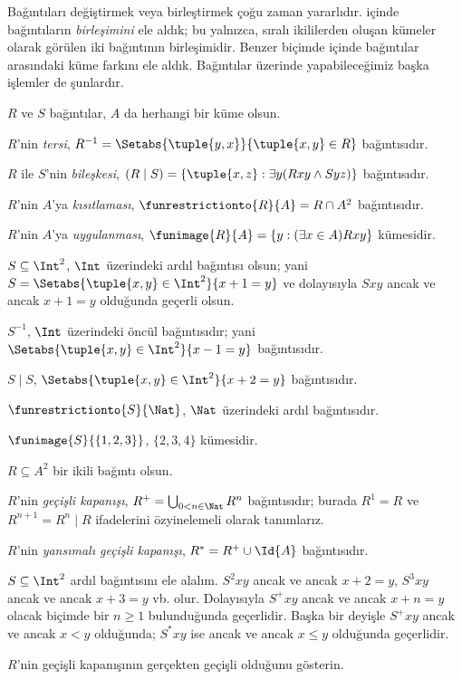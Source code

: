 \documentclass[../../../include/open-logic-section]{subfiles}
\begin{document}

Bağıntıları değiştirmek veya birleştirmek çoğu zaman yararlıdır.
 içinde bağıntıların
\emph{birleşimini} ele aldık; bu yalnızca, sıralı ikililerden oluşan kümeler
olarak görülen iki bağıntının birleşimidir. Benzer biçimde
 içinde bağıntılar arasındaki küme farkını
ele aldık. Bağıntılar üzerinde yapabileceğimiz başka işlemler de şunlardır.

\begin{defn}
$R$ ve $S$ bağıntılar, $A$ da herhangi bir küme olsun.

$R$'nin \emph{tersi},
$R^{-1}=\Setabs{\tuple{y,x}}{\tuple{x,y}\in R}$ bağıntısıdır.

$R$ ile $S$'nin \emph{bileşkesi},
$(R \mid S)=\{\tuple{x,z}:\exists y(Rxy\land Syz)\}$ bağıntısıdır.

$R$'nin $A$'ya \emph{kısıtlaması},
$\funrestrictionto{R}{A}=R\cap A^2$ bağıntısıdır.

$R$'nin $A$'ya \emph{uygulanması},
$\funimage{R}{A}=\{y:(\exists x \in A)Rxy\}$ kümesidir.
\end{defn}

\begin{ex}
$S \subseteq \Int^2$, $\Int$ üzerindeki ardıl bağıntısı olsun; yani
$S=\Setabs{\tuple{x,y}\in\Int^2}{x+1=y}$ ve dolayısıyla $Sxy$ ancak ve ancak
$x+1=y$ olduğunda geçerli olsun.

$S^{-1}$, $\Int$ üzerindeki öncül bağıntısıdır; yani
$\Setabs{\tuple{x,y}\in\Int^2}{x-1=y}$ bağıntısıdır.

$S\mid S$, $\Setabs{\tuple{x,y}\in\Int^2}{x+2=y}$ bağıntısıdır.

$\funrestrictionto{S}{\Nat}$, $\Nat$ üzerindeki ardıl bağıntısıdır.

$\funimage{S}{\{1,2,3\}}$, $\{2,3,4\}$ kümesidir.
\end{ex}

\begin{defn}
$R \subseteq A^2$ bir ikili bağıntı olsun.

$R$'nin \emph{geçişli kapanışı},
$R^+=\bigcup_{0<n\in\Nat}R^n$ bağıntısıdır; burada $R^1=R$ ve
$R^{n+1}=R^n\mid R$ ifadelerini özyinelemeli olarak tanımlarız.

$R$'nin \emph{yansımalı geçişli kapanışı}, $R^*=R^+\cup\Id{A}$ bağıntısıdır.
\end{defn}

\begin{ex}
$S \subseteq \Int^2$ ardıl bağıntısını ele alalım. $S^2xy$ ancak ve ancak
$x+2=y$, $S^3xy$ ancak ve ancak $x+3=y$ vb. olur. Dolayısıyla $S^+xy$ ancak
ve ancak $x+n=y$ olacak biçimde bir $n\geq 1$ bulunduğunda geçerlidir. Başka bir deyişle
$S^+xy$ ancak ve ancak $x<y$ olduğunda; $S^*xy$ ise ancak ve ancak $x\le y$
olduğunda geçerlidir.
\end{ex}

\begin{prob}
$R$'nin geçişli kapanışının gerçekten geçişli olduğunu gösterin.
\end{prob}
\end{document}
